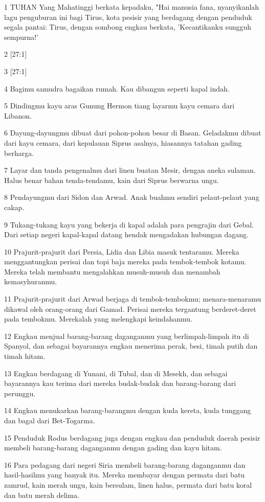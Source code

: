 \par 1 TUHAN Yang Mahatinggi berkata kepadaku, "Hai manusia fana, nyanyikanlah lagu penguburan ini bagi Tirus, kota pesisir yang berdagang dengan penduduk segala pantai: Tirus, dengan sombong engkau berkata, 'Kecantikanku sungguh sempurna!'
\par 2 [27:1]
\par 3 [27:1]
\par 4 Bagimu samudra bagaikan rumah. Kau dibangun seperti kapal indah.
\par 5 Dindingmu kayu aras Gunung Hermon tiang layarmu kayu cemara dari Libanon.
\par 6 Dayung-dayungmu dibuat dari pohon-pohon besar di Basan. Geladakmu dibuat dari kayu cemara, dari kepulauan Siprus asalnya, hiasannya tatahan gading berharga.
\par 7 Layar dan tanda pengenalmu dari linen buatan Mesir, dengan aneka sulaman. Halus benar bahan tenda-tendamu, kain dari Siprus berwarna ungu.
\par 8 Pendayungmu dari Sidon dan Arwad. Anak buahmu sendiri pelaut-pelaut yang cakap.
\par 9 Tukang-tukang kayu yang bekerja di kapal adalah para pengrajin dari Gebal. Dari setiap negeri kapal-kapal datang hendak mengadakan hubungan dagang.
\par 10 Prajurit-prajurit dari Persia, Lidia dan Libia masuk tentaramu. Mereka menggantungkan perisai dan topi baja mereka pada tembok-tembok kotamu. Mereka telah membantu mengalahkan musuh-musuh dan menambah kemasyhuranmu.
\par 11 Prajurit-prajurit dari Arwad berjaga di tembok-tembokmu; menara-menaramu dikawal oleh orang-orang dari Gamad. Perisai mereka tergantung berderet-deret pada tembokmu. Merekalah yang melengkapi keindahanmu.
\par 12 Engkau menjual barang-barang daganganmu yang berlimpah-limpah itu di Spanyol, dan sebagai bayarannya engkau menerima perak, besi, timah putih dan timah hitam.
\par 13 Engkau berdagang di Yunani, di Tubal, dan di Mesekh, dan sebagai bayarannya kau terima dari mereka budak-budak dan barang-barang dari perunggu.
\par 14 Engkau menukarkan barang-barangmu dengan kuda kereta, kuda tunggang dan bagal dari Bet-Togarma.
\par 15 Penduduk Rodus berdagang juga dengan engkau dan penduduk daerah pesisir membeli barang-barang daganganmu dengan gading dan kayu hitam.
\par 16 Para pedagang dari negeri Siria membeli barang-barang daganganmu dan hasil-hasilmu yang banyak itu. Mereka membayar dengan permata dari batu zamrud, kain merah ungu, kain bersulam, linen halus, permata dari batu koral dan batu merah delima.
